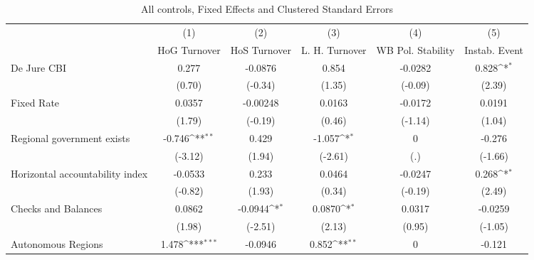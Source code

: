 \begin{table}[htbp]\centering
\def\sym#1{\ifmmode^{#1}\else\(^{#1}\)\fi}
\caption{All controls, Fixed Effects and Clustered Standard Errors \label{fullcmultIndFEDJ}}
\begin{tabular}{l*{5}{c}}
\toprule
                                        &\multicolumn{1}{c}{(1)}&\multicolumn{1}{c}{(2)}&\multicolumn{1}{c}{(3)}&\multicolumn{1}{c}{(4)}&\multicolumn{1}{c}{(5)}\\
                                        &\multicolumn{1}{c}{HoG Turnover}&\multicolumn{1}{c}{HoS Turnover}&\multicolumn{1}{c}{L. H. Turnover}&\multicolumn{1}{c}{WB Pol. Stability}&\multicolumn{1}{c}{Instab. Event}\\
\midrule
De Jure CBI                             &    0.277         &  -0.0876         &    0.854         &  -0.0282         &    0.828\sym{*}  \\
                                        &   (0.70)         &  (-0.34)         &   (1.35)         &  (-0.09)         &   (2.39)         \\
\addlinespace
Fixed Rate                              &   0.0357         & -0.00248         &   0.0163         &  -0.0172         &   0.0191         \\
                                        &   (1.79)         &  (-0.19)         &   (0.46)         &  (-1.14)         &   (1.04)         \\
\addlinespace
Regional government exists              &   -0.746\sym{**} &    0.429         &   -1.057\sym{*}  &        0         &   -0.276         \\
                                        &  (-3.12)         &   (1.94)         &  (-2.61)         &      (.)         &  (-1.66)         \\
\addlinespace
Horizontal accountability index         &  -0.0533         &    0.233         &   0.0464         &  -0.0247         &    0.268\sym{*}  \\
                                        &  (-0.82)         &   (1.93)         &   (0.34)         &  (-0.19)         &   (2.49)         \\
\addlinespace
Checks and Balances                     &   0.0862         &  -0.0944\sym{*}  &   0.0870\sym{*}  &   0.0317         &  -0.0259         \\
                                        &   (1.98)         &  (-2.51)         &   (2.13)         &   (0.95)         &  (-1.05)         \\
\addlinespace
Autonomous Regions                      &    1.478\sym{***}&  -0.0946         &    0.852\sym{**} &        0         &   -0.121         \\

\end{tabular}
\end{table}
